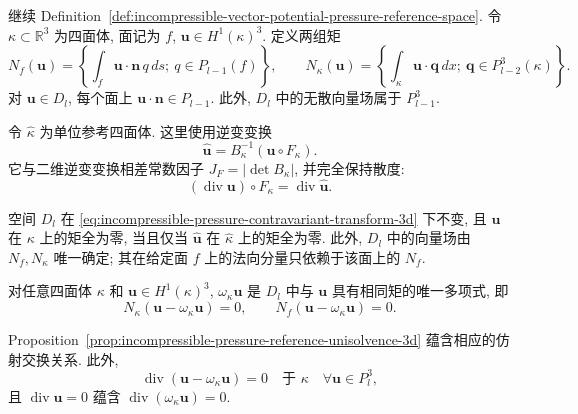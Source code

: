 继续 Definition~\ref{def:incompressible-vector-potential-pressure-reference-space}.
令 $\kappa\subset\mathbb R^3$ 为四面体, 面记为 $f$,
$\mathbf u\in H^1(\kappa)^3$. 定义两组矩
\[
N_f(\mathbf u)=
\left\{\int_f\mathbf u\cdot\mathbf n\,q\,ds;
\ q\in P_{l-1}(f)\right\},
\qquad
N_\kappa(\mathbf u)=
\left\{\int_\kappa\mathbf u\cdot\mathbf q\,dx;
\ \mathbf q\in P_{l-2}^3(\kappa)\right\}.
\]
对 $\mathbf u\in D_l$, 每个面上
$\mathbf u\cdot\mathbf n\in P_{l-1}$.
此外, $D_l$ 中的无散向量场属于 $P_{l-1}^3$.

令 $\widehat\kappa$ 为单位参考四面体.
这里使用逆变变换
\begin{equation}\label{eq:incompressible-pressure-contravariant-transform-3d}
\widehat{\mathbf u}=B_\kappa^{-1}(\mathbf u\circ F_\kappa).
\end{equation}
它与二维逆变变换相差常数因子
$J_F=|\det B_\kappa|$, 并完全保持散度:
\begin{equation}\label{eq:incompressible-pressure-divergence-transform-3d}
(\operatorname{div}\mathbf u)\circ F_\kappa
=\operatorname{div}\widehat{\mathbf u}.
\end{equation}

\begin{Proposition}\label{prop:incompressible-pressure-reference-unisolvence-3d}
空间 $D_l$ 在
\eqref{eq:incompressible-pressure-contravariant-transform-3d} 下不变,
且 $\mathbf u$ 在 $\kappa$ 上的矩全为零, 当且仅当
$\widehat{\mathbf u}$ 在 $\widehat\kappa$ 上的矩全为零.
此外, $D_l$ 中的向量场由 $N_f,N_\kappa$ 唯一确定;
其在给定面 $f$ 上的法向分量只依赖于该面上的 $N_f$.
\end{Proposition}

\begin{Definition}\label{def:incompressible-pressure-interpolant-3d}
对任意四面体 $\kappa$ 和
$\mathbf u\in H^1(\kappa)^3$,
$\omega_\kappa\mathbf u$ 是 $D_l$ 中与 $\mathbf u$
具有相同矩的唯一多项式, 即
\[
N_\kappa(\mathbf u-\omega_\kappa\mathbf u)=0,
\qquad
N_f(\mathbf u-\omega_\kappa\mathbf u)=0.
\]
\end{Definition}
Proposition~\ref{prop:incompressible-pressure-reference-unisolvence-3d}
蕴含相应的仿射交换关系. 此外,
\[
\operatorname{div}(\mathbf u-\omega_\kappa\mathbf u)=0
\quad\text{于 }\kappa\quad\forall\mathbf u\in P_l^3,
\]
且 $\operatorname{div}\mathbf u=0$ 蕴含
$\operatorname{div}(\omega_\kappa\mathbf u)=0$.

